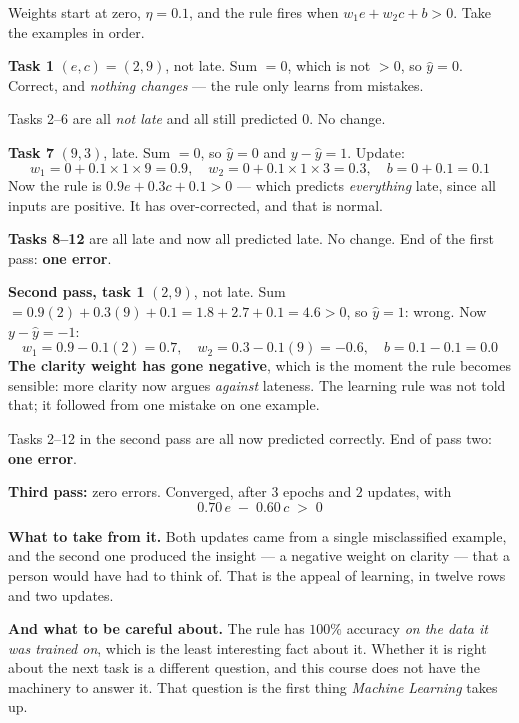 \begin{worked}
Weights start at zero, $\eta = 0.1$, and the rule fires when
$w_{1}e + w_{2}c + b > 0$. Take the examples in order.

\smallskip
\textbf{Task 1} $(e,c) = (2,9)$, not late. Sum $= 0$, which is not $> 0$, so
$\hat{y} = 0$. Correct, and \emph{nothing changes} --- the rule only learns from
mistakes.

\smallskip
Tasks 2--6 are all \emph{not late} and all still predicted $0$. No change.

\smallskip
\textbf{Task 7} $(9,3)$, late. Sum $= 0$, so $\hat{y} = 0$ and
$y - \hat{y} = 1$. Update:
\[
  w_{1} = 0 + 0.1 \times 1 \times 9 = 0.9, \quad
  w_{2} = 0 + 0.1 \times 1 \times 3 = 0.3, \quad
  b = 0 + 0.1 = 0.1
\]
Now the rule is $0.9e + 0.3c + 0.1 > 0$ --- which predicts \emph{everything} late,
since all inputs are positive. It has over-corrected, and that is normal.

\smallskip
\textbf{Tasks 8--12} are all late and now all predicted late. No change. End of the
first pass: \textbf{one error}.

\smallskip
\textbf{Second pass, task 1} $(2,9)$, not late. Sum
$= 0.9(2) + 0.3(9) + 0.1 = 1.8 + 2.7 + 0.1 = 4.6 > 0$, so $\hat{y} = 1$: wrong.
Now $y - \hat{y} = -1$:
\[
  w_{1} = 0.9 - 0.1(2) = 0.7, \quad
  w_{2} = 0.3 - 0.1(9) = -0.6, \quad
  b = 0.1 - 0.1 = 0.0
\]
\textbf{The clarity weight has gone negative}, which is the moment the rule becomes
sensible: more clarity now argues \emph{against} lateness. The learning rule was not
told that; it followed from one mistake on one example.

\smallskip
Tasks 2--12 in the second pass are all now predicted correctly. End of pass two:
\textbf{one error}.

\smallskip
\textbf{Third pass:} zero errors. Converged, after $3$ epochs and $2$ updates, with
\[
  0.70\,e \;-\; 0.60\,c \;>\; 0
\]

\smallskip
\textbf{What to take from it.} Both updates came from a single misclassified
example, and the second one produced the insight --- a negative weight on clarity
--- that a person would have had to think of. That is the appeal of learning, in
twelve rows and two updates.

\smallskip
\textbf{And what to be careful about.} The rule has $100\%$ accuracy \emph{on the
data it was trained on}, which is the least interesting fact about it. Whether it is
right about the next task is a different question, and this course does not have the
machinery to answer it. That question is the first thing \emph{Machine Learning}
takes up.
\end{worked}

